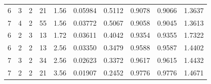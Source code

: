 \documentclass[11pt,a4paper]{ctexart}
\theoremstyle{definition}
\begin{document}
\begin{table}[h]
\begin{tabular}{cccccccccc}
6 & 3 & 2 & 21 & 1.56 & 0.05984 & 0.5112 & 0.9078 & 0.9066 & 1.3637 \\
7 & 4 & 2 & 55 & 1.56 & 0.03772 & 0.5067 & 0.9058 & 0.9045 & 1.3613 \\
6 & 2 & 3 & 13 & 1.72 & 0.03611 & 0.4042 & 0.9354 & 0.9355 & 1.7322 \\
6 & 2 & 2 & 13 & 2.56 & 0.03350 & 0.3479 & 0.9588 & 0.9587 & 1.4402 \\
7 & 3 & 2 & 34 & 2.56 & 0.02623 & 0.3372 & 0.9617 & 0.9615 & 1.4432 \\
7 & 2 & 2 & 21 & 3.56 & 0.01907 & 0.2452 & 0.9776 & 0.9776 & 1.4671 \\
\bottomrule
\end{tabular}
\end{table}
\end{document}
